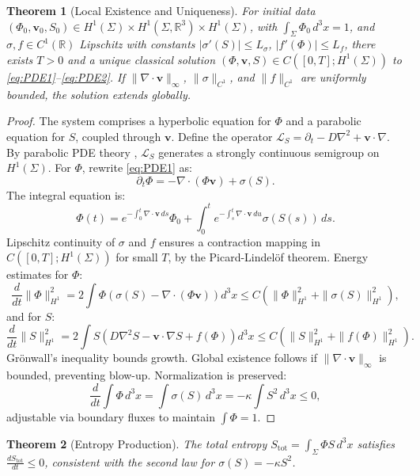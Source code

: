 \documentclass[12pt]{article}
\newtheorem{theorem}{Theorem}
\begin{document}
\begin{theorem}[Local Existence and Uniqueness]
\label{thm:well-posedness}
For initial data \((\Phi_0, \mathbf{v}_0, S_0) \in H^1(\Sigma) \times H^1(\Sigma, \mathbb{R}^3) \times H^1(\Sigma)\), with \(\int_\Sigma \Phi_0 \, d^3x = 1\), and \(\sigma, f \in C^1(\mathbb{R})\) Lipschitz with constants \(|\sigma'(S)| \leq L_\sigma\), \(|f'(\Phi)| \leq L_f\), there exists \(T > 0\) and a unique classical solution \((\Phi, \mathbf{v}, S) \in C([0, T]; H^1(\Sigma))\) to \eqref{eq:PDE1}--\eqref{eq:PDE2}. If \(\|\nabla \cdot \mathbf{v}\|_\infty\), \(\|\sigma\|_{C^1}\), and \(\|f\|_{C^1}\) are uniformly bounded, the solution extends globally.
\end{theorem}

\begin{proof}
The system comprises a hyperbolic equation for \(\Phi\) and a parabolic equation for \(S\), coupled through \(\mathbf{v}\). Define the operator \(\mathcal{L}_S = \partial_t - D \nabla^2 + \mathbf{v} \cdot \nabla\). By parabolic PDE theory \citep{Risken1996}, \(\mathcal{L}_S\) generates a strongly continuous semigroup on \(H^1(\Sigma)\). For \(\Phi\), rewrite \eqref{eq:PDE1} as:
\[
\partial_t \Phi = -\nabla \cdot (\Phi \mathbf{v}) + \sigma(S).
\]
The integral equation is:
\[
\Phi(t) = e^{-\int_0^t \nabla \cdot \mathbf{v} \, ds} \Phi_0 + \int_0^t e^{-\int_s^t \nabla \cdot \mathbf{v} \, du} \sigma(S(s)) \, ds.
\]
Lipschitz continuity of \(\sigma\) and \(f\) ensures a contraction mapping in \(C([0, T]; H^1(\Sigma))\) for small \(T\), by the Picard-Lindelöf theorem. Energy estimates for \(\Phi\):
\[
\frac{d}{dt} \|\Phi\|_{H^1}^2 = 2 \int \Phi \left( \sigma(S) - \nabla \cdot (\Phi \mathbf{v}) \right) d^3x \leq C (\|\Phi\|_{H^1}^2 + \|\sigma(S)\|_{H^1}^2),
\]
and for \(S\):
\[
\frac{d}{dt} \|S\|_{H^1}^2 = 2 \int S \left( D \nabla^2 S - \mathbf{v} \cdot \nabla S + f(\Phi) \right) d^3x \leq C (\|S\|_{H^1}^2 + \|f(\Phi)\|_{H^1}^2).
\]
Grönwall’s inequality bounds growth. Global existence follows if \(\|\nabla \cdot \mathbf{v}\|_\infty\) is bounded, preventing blow-up. Normalization is preserved:
\[
\frac{d}{dt} \int \Phi \, d^3x = \int \sigma(S) \, d^3x = -\kappa \int S^2 \, d^3x \leq 0,
\]
adjustable via boundary fluxes to maintain \(\int \Phi = 1\).
\end{proof}

\begin{theorem}[Entropy Production]
\label{thm:entropy}
The total entropy \(S_{\text{tot}} = \int_\Sigma \Phi S \, d^3x\) satisfies \(\frac{d S_{\text{tot}}}{dt} \leq 0\), consistent with the second law for \(\sigma(S) = -\kappa S^2\).
\end{theorem}
\end{document}
